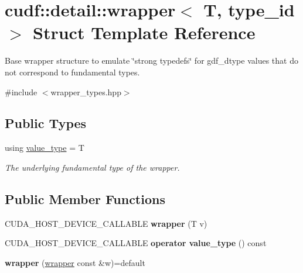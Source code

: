 \hypertarget{structcudf_1_1detail_1_1wrapper}{}\section{cudf\+:\+:detail\+:\+:wrapper$<$ T, type\+\_\+id $>$ Struct Template Reference}
\label{structcudf_1_1detail_1_1wrapper}


Base wrapper structure to emulate \char`\"{}strong typedefs\char`\"{} for gdf\+\_\+dtype values that do not correspond to fundamental types.  




{\ttfamily \#include $<$wrapper\+\_\+types.\+hpp$>$}

\subsection*{Public Types}
\begin{DoxyCompactItemize}
\item 
using \hyperlink{structcudf_1_1detail_1_1wrapper_a8acf68753d62cd6210b6c4b69fdaebef}{value\+\_\+type} = T\hypertarget{structcudf_1_1detail_1_1wrapper_a8acf68753d62cd6210b6c4b69fdaebef}{}\label{structcudf_1_1detail_1_1wrapper_a8acf68753d62cd6210b6c4b69fdaebef}

\begin{DoxyCompactList}\small\item\em The underlying fundamental type of the wrapper. \end{DoxyCompactList}\end{DoxyCompactItemize}
\subsection*{Public Member Functions}
\begin{DoxyCompactItemize}
\item 
C\+U\+D\+A\+\_\+\+H\+O\+S\+T\+\_\+\+D\+E\+V\+I\+C\+E\+\_\+\+C\+A\+L\+L\+A\+B\+LE {\bfseries wrapper} (T v)\hypertarget{structcudf_1_1detail_1_1wrapper_a8c8dfed2413c0d21a95c1880cf7f630f}{}\label{structcudf_1_1detail_1_1wrapper_a8c8dfed2413c0d21a95c1880cf7f630f}

\item 
C\+U\+D\+A\+\_\+\+H\+O\+S\+T\+\_\+\+D\+E\+V\+I\+C\+E\+\_\+\+C\+A\+L\+L\+A\+B\+LE {\bfseries operator value\+\_\+type} () const \hypertarget{structcudf_1_1detail_1_1wrapper_a52e86a2a52949e4a75ae3426efff3726}{}\label{structcudf_1_1detail_1_1wrapper_a52e86a2a52949e4a75ae3426efff3726}

\item 
{\bfseries wrapper} (\hyperlink{structcudf_1_1detail_1_1wrapper}{wrapper} const \&w)=default\hypertarget{structcudf_1_1detail_1_1wrapper_a7bb3ed25c664b5bfa8fa352b124c8d3e}{}\label{structcudf_1_1detail_1_1wrapper_a7bb3ed25c664b5bfa8fa352b124c8d3e}

\end{DoxyCompactItemize}
